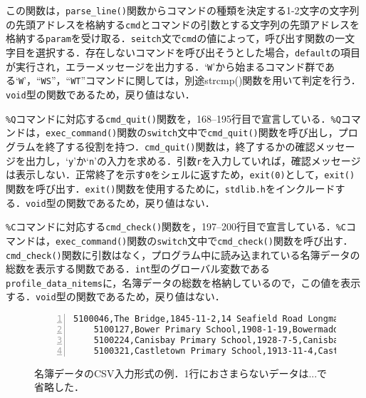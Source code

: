 この関数は，\verb|parse_line()|関数からコマンドの種類を決定する1-2文字の文字列の先頭アドレスを格納する\verb|cmd|とコマンドの引数とする文字列の先頭アドレスを格納する\verb|param|を受け取る．\verb|seitch|文で\verb|cmd|の値によって，呼び出す関数の一文字目を選択する．存在しないコマンドを呼び出そうとした場合，\verb|default|の項目が実行され，エラーメッセージを出力する．‘\verb|W|’から始まるコマンド群である‘\verb|W|’，“\verb|WS|”，“\verb|WT|”コマンドに関しては，別途strcmp()関数を用いて判定を行う．\verb|void|型の関数であるため，戻り値はない．

\verb|%Q|コマンドに対応する\verb|cmd_quit()|関数を，168--195行目で宣言している．\verb|%Q|コマンドは，\verb|exec_command()|関数の\verb|switch|文中で\verb|cmd_quit()|関数を呼び出し，プログラムを終了する役割を持つ．\verb|cmd_quit()|関数は，終了するかの確認メッセージを出力し，‘\verb|y|’か‘\verb|n|’の入力を求める．引数\verb|r|を入力していれば，確認メッセージは表示しない．正常終了を示す\verb|0|をシェルに返すため，\verb|exit(0)|として，\verb|exit()|関数を呼び出す．\verb|exit()|関数を使用するために，\verb|stdlib.h|をインクルードする．\verb|void|型の関数であるため，戻り値はない．

\verb|%C|コマンドに対応する\verb|cmd_check()|関数を，197--200行目で宣言している．\verb|%C|コマンドは，\verb|exec_command()|関数の\verb|switch|文中で\verb|cmd_check()|関数を呼び出す．\verb|cmd_check()|関数に引数はなく，プログラム中に読み込まれている名簿データの総数を表示する関数である．\verb|int|型のグローバル変数である\verb|profile_data_nitems|に，名簿データの総数を格納しているので，この値を表示する．\verb|void|型の関数であるため，戻り値はない．


\begin{figure}[b]
\centering %
\begin{Verbatim}[frame=single, xleftmargin=5mm, xrightmargin=5mm, gobble=4,
                 fontsize=\small, numbers=left, firstnumber=1]
    5100046,The Bridge,1845-11-2,14 Seafield Road Longman Inverness,SEN Unit 2.0 Open
    5100127,Bower Primary School,1908-1-19,Bowermadden Bower Caithness,01955 641225 ...
    5100224,Canisbay Primary School,1928-7-5,Canisbay Wick,01955 611337 Primary 56 3...
    5100321,Castletown Primary School,1913-11-4,Castletown Thurso,01847 821256 01847...
\end{Verbatim}
    \caption{名簿データのCSV入力形式の例．1行におさまらないデータは...で省略した．}
    \label{fig:csvdata}
\end{figure}


